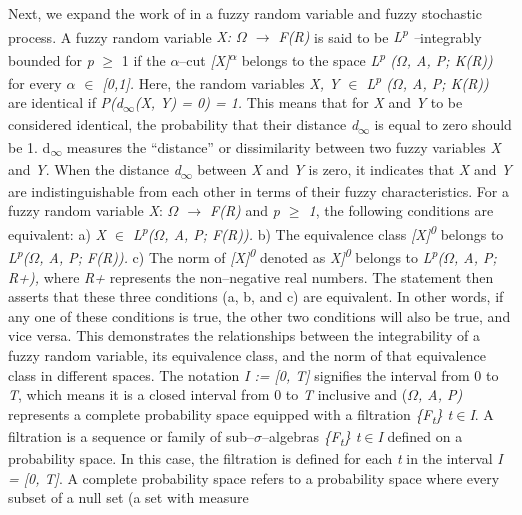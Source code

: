 \documentclass[12pt,a4paper]{report}
\numberwithin{equation}{section}
\begin{document}
Next, we expand the work of \cite{jafari2021fuzzy_81} in a fuzzy random variable and
fuzzy stochastic process. A fuzzy random variable \emph{X: $\Omega$ $\rightarrow$ F(R)} is
said to be \emph{L\textsuperscript{p} --}integrably bounded for \emph{p}
$\geq$ 1 if the $\alpha$--cut
\emph{{[}X{]}\textsuperscript{$\alpha$}} belongs to the space
\emph{L\textsuperscript{p} ($\Omega$, A, P; K(R))} for every \emph{$\alpha$ $\in$
{[}0,1{]}.} Here, the random variables \emph{X, Y $\in$ L\textsuperscript{p}
($\Omega$, A, P; K(R))} are identical if \emph{P(d\textsubscript{$\infty$}(X, Y) = 0)
= 1.} This means that for \emph{X} and \emph{Y} to be considered
identical, the probability that their distance \emph{d\textsubscript{$\infty$}}
is equal to zero should be 1. d\textsubscript{$\infty$} measures the
``distance'' or dissimilarity between two fuzzy variables \emph{X} and
\emph{Y}. When the distance \emph{d\textsubscript{$\infty$}} between \emph{X}
and \emph{Y} is zero, it indicates that \emph{X} and \emph{Y} are
indistinguishable from each other in terms of their fuzzy
characteristics. For a fuzzy random variable \emph{X}: \emph{$\Omega$ $\rightarrow$ F(R)}
and \emph{p $\geq$ 1}, the following conditions are equivalent: a) \emph{X $\in$
L\textsuperscript{p}($\Omega$, A, P; F(R)).} b) The equivalence class
\emph{{[}X{]}\textsuperscript{0}} belongs to
\emph{L\textsuperscript{p}($\Omega$, A, P; F(R)).} c) The norm of
\emph{{[}X{]}\textsuperscript{0}} denoted as
\emph{\textbar\textbar{[}X{]}\textsuperscript{0}\textbar\textbar{}}
belongs to \emph{L\textsuperscript{p}($\Omega$, A, P; R+),} where \emph{R+}
represents the non--negative real numbers. The statement then asserts
that these three conditions (a, b, and c) are equivalent. In other
words, if any one of these conditions is true, the other two conditions
will also be true, and vice versa. This demonstrates the relationships
between the integrability of a fuzzy random variable, its equivalence
class, and the norm of that equivalence class in different spaces. The
notation \emph{I := {[}0, T{]}} signifies the interval from 0 to
\emph{T}, which means it is a closed interval from 0 to \emph{T}
inclusive and (\emph{$\Omega$, A, P)} represents a complete probability space
equipped with a filtration \emph{\{F\textsubscript{t}\} t$\in$I}. A
filtration is a sequence or family of sub--$\sigma$--algebras
\emph{\{F\textsubscript{t}\} t$\in$I} defined on a probability space. In this
case, the filtration is defined for each \emph{t} in the interval
\emph{I = {[}0, T{]}}. A complete probability space refers to a
probability space where every subset of a null set (a set with measure
\end{document}
